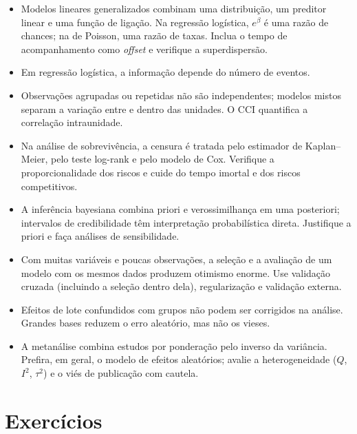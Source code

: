 \documentclass[
]{book}
\providecommand{\tightlist}{%
  \setlength{\itemsep}{0pt}\setlength{\parskip}{0pt}}
\begin{document}
\begin{itemize}
\tightlist
\item
  Modelos lineares generalizados combinam uma distribuição, um preditor linear e uma função de ligação. Na regressão logística, \(e^{\beta}\) é uma razão de chances; na de Poisson, uma razão de taxas. Inclua o tempo de acompanhamento como \emph{offset} e verifique a superdispersão.
\item
  Em regressão logística, a informação depende do número de eventos.
\item
  Observações agrupadas ou repetidas não são independentes; modelos mistos separam a variação entre e dentro das unidades. O CCI quantifica a correlação intraunidade.
\item
  Na análise de sobrevivência, a censura é tratada pelo estimador de Kaplan--Meier, pelo teste log-rank e pelo modelo de Cox. Verifique a proporcionalidade dos riscos e cuide do tempo imortal e dos riscos competitivos.
\item
  A inferência bayesiana combina priori e verossimilhança em uma posteriori; intervalos de credibilidade têm interpretação probabilística direta. Justifique a priori e faça análises de sensibilidade.
\item
  Com muitas variáveis e poucas observações, a seleção e a avaliação de um modelo com os mesmos dados produzem otimismo enorme. Use validação cruzada (incluindo a seleção dentro dela), regularização e validação externa.
\item
  Efeitos de lote confundidos com grupos não podem ser corrigidos na análise. Grandes bases reduzem o erro aleatório, mas não os vieses.
\item
  A metanálise combina estudos por ponderação pelo inverso da variância. Prefira, em geral, o modelo de efeitos aleatórios; avalie a heterogeneidade (\(Q\), \(I^2\), \(\tau^2\)) e o viés de publicação com cautela.
\end{itemize}

\section{Exercícios}\label{exercuxedcios-9}
\end{document}
